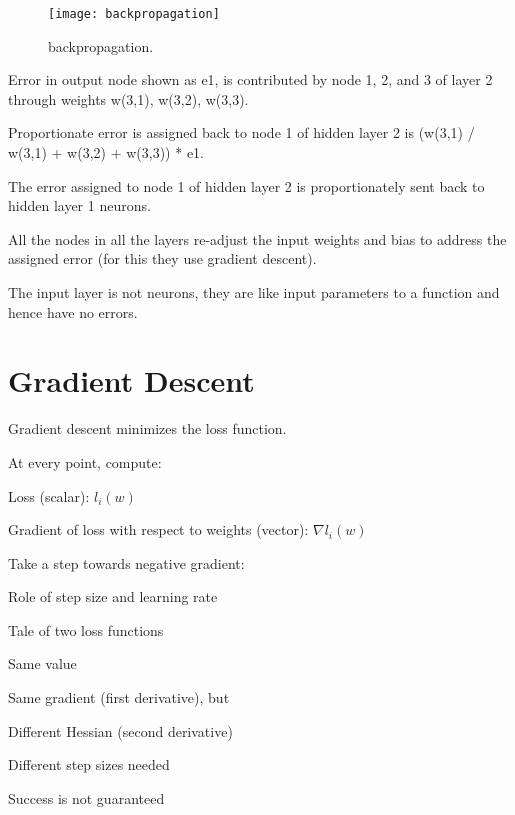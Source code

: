  	\begin{figure}[h]
		\centering
		\texttt{[image: backpropagation]}
		\caption[backpropagation]{backpropagation.}
		\label{fig:backpropagation}
	\end{figure}

	\begin{bulletedlist}
		\item Error in output node shown as e1, is contributed by node 1, 2, and 3 of layer 2 through weights w(3,1), w(3,2), w(3,3).
		\item Proportionate error is assigned back to node 1 of hidden layer 2 is (w(3,1) / w(3,1) + w(3,2) + w(3,3)) * e1.
		\item The error assigned to node 1 of hidden layer 2 is proportionately sent back to hidden layer 1 neurons.
		\item All the nodes in all the layers re-adjust the input weights and bias to address the assigned error (for this they use gradient descent).
		\item The input layer is not neurons, they are like input parameters to a function and hence have no errors.
	\end{bulletedlist}


	\section{Gradient Descent}

	\begin{bulletedlist}
		\item Gradient descent minimizes the loss function.
		\item At every point, compute:
		\begin{bulletedlist}
			\item Loss (scalar): $l_i(w)$
			\item Gradient of loss with respect to weights (vector): $\nabla l_i(w)$
			\item Take a step towards negative gradient:
		\end{bulletedlist}
	\end{bulletedlist}

Role of step size and learning rate
	\begin{bulletedlist}
		\item Tale of two loss functions
		\begin{bulletedlist}
			\item Same value
			\item Same gradient (first derivative), but
			\item Different Hessian (second derivative)
			\item Different step sizes needed
		\end{bulletedlist}
		\item Success is not guaranteed
	\end{bulletedlist}

